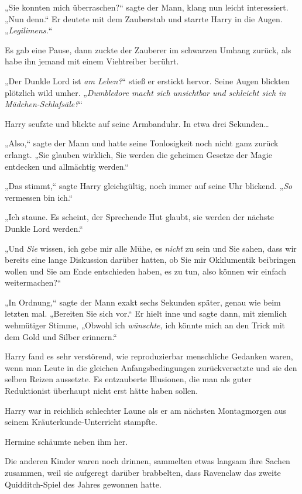 {„Sie konnten mich überraschen?“ sagte der Mann, klang nun leicht interessiert. „Nun denn.“ Er deutete mit dem Zauberstab und starrte Harry in die Augen. „\emph{Legilimens.}“

Es gab eine Pause, dann zuckte der Zauberer im schwarzen Umhang zurück, als habe ihn jemand mit einem Viehtreiber berührt.

„Der Dunkle Lord ist \emph{am Leben?}“ stieß er erstickt hervor. Seine Augen blickten plötzlich wild umher. „\emph{Dumbledore macht sich unsichtbar und schleicht sich in Mädchen-Schlafsäle?}“

Harry seufzte und blickte auf seine Armbanduhr. In etwa drei Sekunden…

„Also,“ sagte der Mann und hatte seine Tonlosigkeit noch nicht ganz zurück erlangt. „Sie glauben wirklich, Sie werden die geheimen Gesetze der Magie entdecken und allmächtig werden.“

„Das stimmt,“ sagte Harry gleichgültig, noch immer auf seine Uhr blickend. „\emph{So} vermessen bin ich.“

„Ich staune. Es scheint, der Sprechende Hut glaubt, sie werden der nächste Dunkle Lord werden.“

„Und \emph{Sie} wissen, ich gebe mir alle Mühe, es \emph{nicht} zu sein und Sie sahen, dass wir bereits eine lange Diskussion darüber hatten, ob Sie mir Okklumentik beibringen wollen und Sie am Ende entschieden haben, es zu tun, also können wir einfach weitermachen?“

„In Ordnung,“ sagte der Mann exakt sechs Sekunden später, genau wie beim letzten mal. „Bereiten Sie sich vor.“ Er hielt inne und sagte dann, mit ziemlich wehmütiger Stimme, „Obwohl ich \emph{wünschte,} ich könnte mich an den Trick mit dem Gold und Silber erinnern.“

Harry fand es sehr verstörend, wie reproduzierbar menschliche Gedanken waren, wenn man Leute in die gleichen Anfangsbedingungen zurückversetzte und sie den selben Reizen aussetzte. Es entzauberte Illusionen, die man als guter Reduktionist überhaupt nicht erst hätte haben sollen.

\later

Harry war in reichlich schlechter Laune als er am nächsten Montagmorgen aus seinem Kräuterkunde-Unterricht stampfte.

Hermine schäumte neben ihm her.

Die anderen Kinder waren noch drinnen, sammelten etwas langsam ihre Sachen zusammen, weil sie aufgeregt darüber brabbelten, dass Ravenclaw das zweite Quidditch-Spiel des Jahres gewonnen hatte.

}
